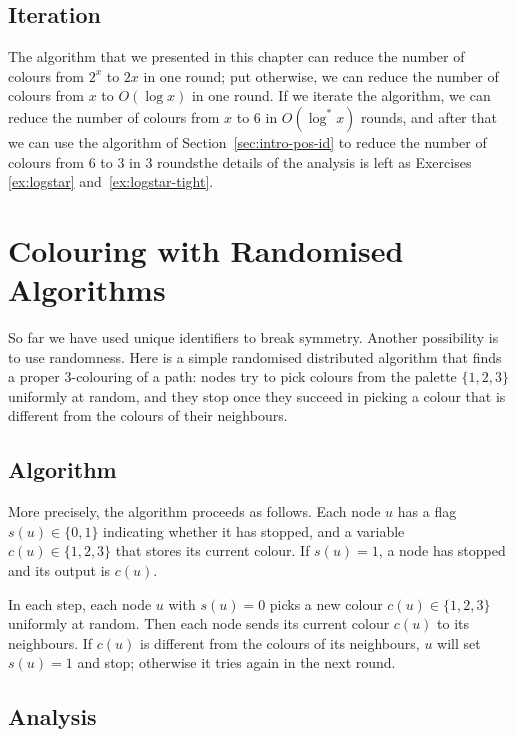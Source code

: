 \subsection{Iteration}

The algorithm that we presented in this chapter can reduce the number of colours from $2^x$ to $2x$ in one round; put otherwise, we can reduce the number of colours from $x$ to $O(\log x)$ in one round. If we iterate the algorithm, we can reduce the number of colours from $x$ to $6$ in $O(\log^* x)$ rounds, and after that we can use the algorithm of Section~\ref{sec:intro-pos-id} to reduce the number of colours from $6$ to $3$ in $3$ rounds\mydash the details of the analysis is left as Exercises \ref{ex:logstar} and~\ref{ex:logstar-tight}.


\section{Colouring with Randomised Algorithms}\label{sec:intro-pos-random}

So far we have used unique identifiers to break symmetry. Another possibility is to use randomness. Here is a simple randomised distributed algorithm that finds a proper $3$-colouring of a path: nodes try to pick colours from the palette $\{1,2,3\}$ uniformly at random, and they stop once they succeed in picking a colour that is different from the colours of their neighbours.


\subsection{Algorithm}

More precisely, the algorithm proceeds as follows. Each node $u$ has a flag $s(u) \in \{0,1\}$ indicating whether it has stopped, and a variable $c(u) \in \{1,2,3\}$ that stores its current colour. If $s(u) = 1$, a node has stopped and its output is $c(u)$.

In each step, each node $u$ with $s(u) = 0$ picks a new colour $c(u) \in \{1,2,3\}$ uniformly at random. Then each node sends its current colour $c(u)$ to its neighbours. If $c(u)$ is different from the colours of its neighbours, $u$ will set $s(u) = 1$ and stop; otherwise it tries again in the next round.


\subsection{Analysis}

